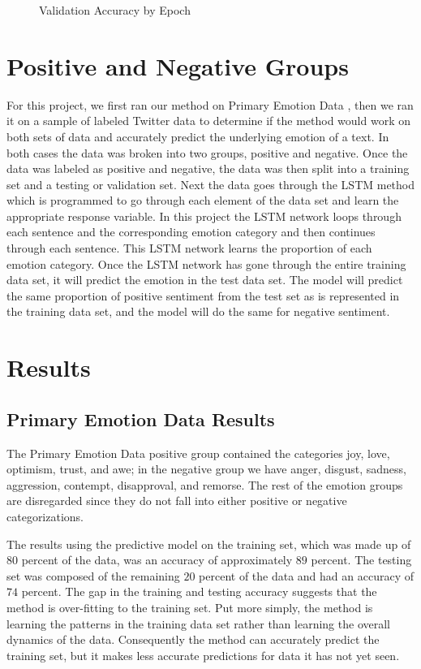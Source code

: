 \documentclass[titlepage,letterpaper]{article}
\begin{document}
\begin{figure}[htb]
	\centering
	\resizebox{4in}{!}{}
	\caption{Validation Accuracy by Epoch}
	\label{valepoch}
\end{figure}

\section{Positive and Negative Groups}

For this project, we first ran our method on Primary Emotion Data \cite{lowriwilliams}, then we ran it on a sample of labeled Twitter data \cite{LabeledTwitter} to determine if the method would work on both sets of data and accurately predict the underlying emotion of a text. In both cases the data was broken into two groups, positive and negative. Once the data was labeled as positive and negative, the data was then split into a training set and a testing or validation set. Next the data goes through the LSTM method which is programmed to go through each element of the data set and learn the appropriate response variable. In this project the LSTM network loops through each sentence and the corresponding emotion category and then continues through each sentence. This LSTM network learns the proportion of each emotion category. Once the LSTM network has gone through the entire training data set, it will predict the emotion in the test data set. The model will predict the same proportion of positive sentiment from the test set as is represented in the training data set, and the model will do the same for negative sentiment. 

\section{Results}

\subsection{Primary Emotion Data Results}
The Primary Emotion Data positive group contained the categories joy, love, optimism, trust, and awe; in the negative group we have anger, disgust, sadness, aggression, contempt, disapproval, and remorse. The rest of the emotion groups are disregarded since they do not fall into either positive or negative categorizations.

The results using the predictive model on the training set, which was made up of $80$ percent of the data, was an accuracy of approximately $89$ percent. The testing set was composed of the remaining $20$ percent of the data and had an accuracy of $74$ percent. The gap in the training and testing accuracy suggests that the method is over-fitting to  the training set. Put more simply, the method is learning the patterns in the training data set rather than learning the overall dynamics of the data. Consequently the method can accurately predict the training set, but it makes less accurate predictions for data it has not yet seen.
\end{document}
